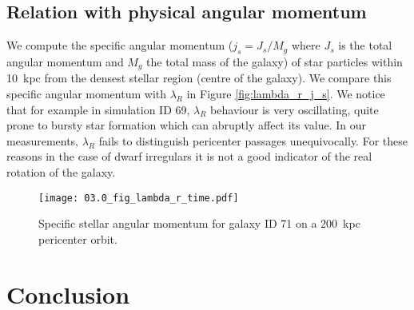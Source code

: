 

\subsection{Relation with physical angular momentum}
We compute the specific angular momentum ($j_s = J_s/M_g$ where $J_s$ is the total angular momentum and $M_g$ the total mass of the galaxy) of star particles within 10~kpc from the densest stellar region (centre of the galaxy).
We compare this specific angular momentum with $\lambda_R$ in Figure \ref{fig:lambda_r_j_s}.
We notice that for example in simulation ID 69, $\lambda_R$ behaviour is very oscillating, quite prone to bursty star formation which can abruptly affect its value.
In our measurements, $\lambda_R$ fails to distinguish pericenter passages unequivocally.
For these reasons in the case of dwarf irregulars it is not a good indicator of the real rotation of the galaxy.

\begin{figure}
\centering
\texttt{[image: 03.0\_fig\_lambda\_r\_time.pdf]}
\caption{Specific stellar angular momentum for galaxy ID 71 on a $200$~kpc pericenter orbit.}
\label{fig:lambda_R}
\end{figure}

\section{Conclusion}


% 

